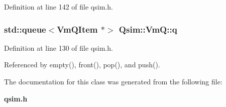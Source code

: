 Definition at line 142 of file qsim.h.
\subsubsection[{q}]{\setlength{\rightskip}{0pt plus 5cm}std::queue$<${\bf VmQItem} $\ast$$>$ {\bf Qsim::VmQ::q}\hspace{0.3cm}{\tt  [private]}}\label{classQsim_1_1VmQ_a2f217bc8def898995620e99762243c6}




Definition at line 130 of file qsim.h.

Referenced by empty(), front(), pop(), and push().

The documentation for this class was generated from the following file:\begin{CompactItemize}
\item 
{\bf qsim.h}\end{CompactItemize}
